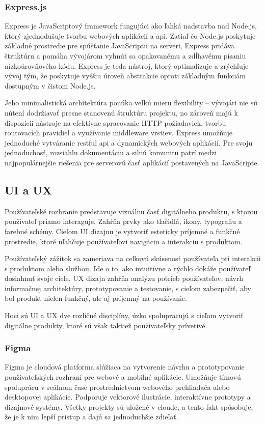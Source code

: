 \subsubsection{Express.js}
Express je JavaScriptový framework fungujúci ako ľahká nadstavba nad Node.js, ktorý zjednodušuje tvorbu webových aplikácií a \acrshort{api}.
Zatiaľ čo Node.js poskytuje základné prostredie pre spúšťanie JavaScriptu na serveri, Express pridáva štruktúru a pomáha vývojárom vyhnúť sa opakovanému a zdĺhavému písaniu nízkoúrovňového kódu. 
Express je teda nástroj, ktorý optimalizuje a zrýchľuje vývoj tým, že poskytuje vyššiu úroveň abstrakcie oproti základným funkciám dostupným v čistom Node.js.

Jeho minimalistická architektúra ponúka veľkú mieru flexibility – vývojári nie sú nútení dodržiavať presne stanovenú štruktúru projektu, no zároveň majú k dispozícii nástroje na efektívne spracovanie HTTP požiadaviek, tvorbu routovacích pravidiel a využívanie middleware vrstiev. 
Express umožňuje jednoduché vytváranie \acrshort{rest}ful \acrshort{api} a dynamických webových aplikácií.
Pre svoju jednoduchosť, rozsiahlu dokumentáciu a silnú komunitu patrí medzi najpopulárnejšie riešenia pre serverovú časť aplikácií postavených na JavaScripte.\cite{express}\cite{backendframework}
\subsection{UI a UX}
Používateľské rozhranie predstavuje vizuálnu časť digitálneho produktu, s ktorou používateľ priamo interaguje. 
Zahŕňa prvky ako tlačidlá, ikony, typografiu a farebné schémy. 
Cieľom UI dizajnu je vytvoriť esteticky príjemné a funkčné prostredie, ktoré uľahčuje používateľovi navigáciu a interakciu s produktom.

Používateľský zážitok sa zameriava na celkovú skúsenosť používateľa pri interakcii s produktom alebo službou. 
Ide o to, ako intuitívne a rýchlo dokáže používateľ dosiahnuť svoje ciele. 
UX dizajn zahŕňa analýzu potrieb používateľov, návrh informačnej architektúry, prototypovanie a testovanie, s cieľom zabezpečiť, aby bol produkt nielen funkčný, ale aj príjemný na používanie.

Hoci sú UI a UX dve rozličné disciplíny, úzko spolupracujú s cieľom vytvoriť digitálne produkty, ktoré sú však taktiež použivateľsky prívetivé.\cite{uiux}
\subsubsection{Figma}
Figma je cloudová platforma slúžiaca na vytvorenie návrhu a prototypovanie používateľských rozhraní pre webové a mobilné aplikácie. 
Umožňuje tímovú spoluprácu v reálnom čase prostredníctvom webového prehliadača alebo desktopovej aplikácie. Podporuje vektorové ilustrácie, interaktívne prototypy a dizajnové systémy.
 Všetky projekty sú uložené v cloude, a tento fakt spôsobuje, že je k nim lepší prístup a dajú sa jednoduchšie zdieľať. \cite{figma}
